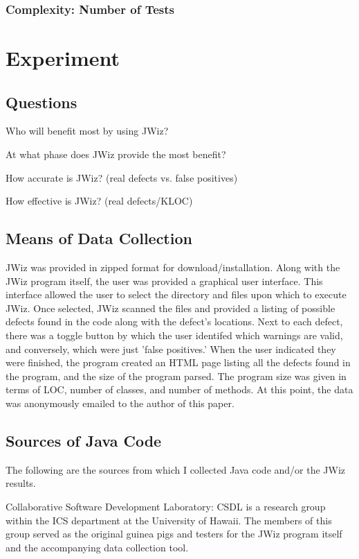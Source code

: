 \subsection{Complexity: Number of Tests}





\chapter{Experiment}

\section{Questions}
Who will benefit most by using JWiz?

At what phase does JWiz provide the most benefit?

How accurate is JWiz? (real defects vs. false positives)

How effective is JWiz? (real defects/KLOC)


\section{Means of Data Collection}
JWiz was provided in zipped format for download/installation.  Along with
the JWiz program itself, the user was provided a graphical user interface.
This interface allowed the user to select the directory and files upon
which to execute JWiz.  Once selected, JWiz scanned the files and provided
a listing of possible defects found in the code along with the defect's
locations.  Next to each defect, there was a toggle button by which the
user identifed which warnings are valid, and conversely, which were just
'false positives.'  When the user indicated they were finished, the program
created an HTML page listing all the defects found in the program, and the
size of the program parsed.  The program size was given in terms of LOC,
number of classes, and number of methods. At this point, the data was
anonymously emailed to the author of this paper.

\section{Sources of Java Code}
The following are the sources from which I collected Java code and/or the
JWiz results.

Collaborative Software Development Laboratory: CSDL is a research group
within the ICS department at the University of Hawaii.  The members of this
group served as the original guinea pigs and testers for the JWiz program
itself and the accompanying data collection tool.

